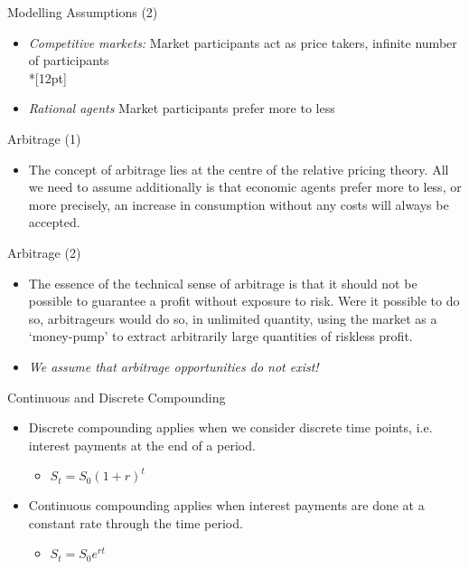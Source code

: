 { Modelling Assumptions (2)}
\begin{itemize}
\item<1-> {\it Competitive markets:}  Market participants
act as price takers, infinite number of participants\\*[12pt]
\item<2-> {\it Rational agents} Market
participants prefer more to less
\end{itemize}



{ Arbitrage (1)}
\begin{itemize}
  \item The concept of arbitrage lies at
the centre of the relative pricing theory. All we need to assume additionally is
that economic agents prefer
more to less, or more precisely, an increase in consumption
without any costs will always be accepted.
\end{itemize}


{ Arbitrage (2)}
\begin{itemize}
  \item The essence of the technical sense of arbitrage is that it should
not be possible to guarantee a profit without exposure to risk.
Were it possible to do so, arbitrageurs would do so, in unlimited quantity,
using the market as a \lq {money-pump}' to extract arbitrarily
large quantities of riskless profit.
  \item {\it We assume that arbitrage opportunities do not exist!}
\end{itemize}


{Continuous and Discrete Compounding}
\begin{itemize}
  \item <1->Discrete compounding applies when we consider discrete time points, i.e. interest payments at the end of a period.\\
      \begin{itemize}
        \item $S_t = S_0 (1+r)^t$
      \end{itemize}

  \item<2-> Continuous compounding applies when interest payments are done at a constant rate through the time period. \\
      \begin{itemize}
        \item $S_t = S_0e^{rt}$
      \end{itemize}
 \end{itemize}





